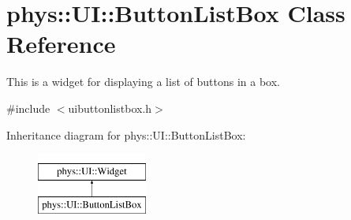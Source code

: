 \hypertarget{classphys_1_1UI_1_1ButtonListBox}{
\section{phys::UI::ButtonListBox Class Reference}
\label{d4/dd7/classphys_1_1UI_1_1ButtonListBox}
}


This is a widget for displaying a list of buttons in a box.  




{\ttfamily \#include $<$uibuttonlistbox.h$>$}

Inheritance diagram for phys::UI::ButtonListBox:\begin{figure}[H]
\begin{center}
\leavevmode
\includegraphics[height=2cm]{d4/dd7/classphys_1_1UI_1_1ButtonListBox}
\end{center}
\end{figure}
